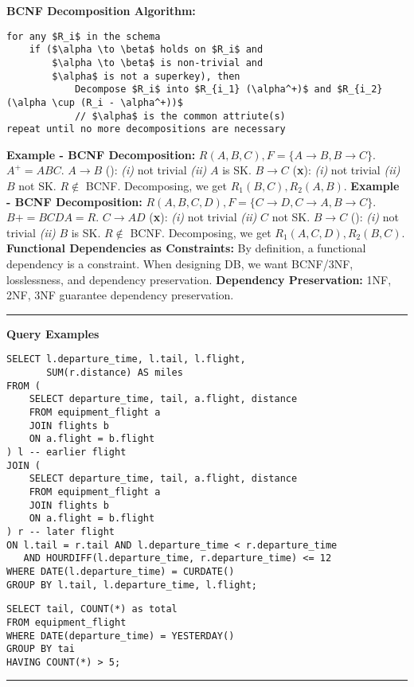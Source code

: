 \documentclass{report}
\renewcommand{\bf}[1]{\textbf{{#1}}}
\renewcommand{\it}[1]{\textit{{#1}}}
\begin{document}
\bf{BCNF Decomposition Algorithm:}
\vspace{-0.8em}
\begin{lstlisting}
for any $R_i$ in the schema
    if ($\alpha \to \beta$ holds on $R_i$ and
        $\alpha \to \beta$ is non-trivial and
        $\alpha$ is not a superkey), then
            Decompose $R_i$ into $R_{i_1} (\alpha^+)$ and $R_{i_2} (\alpha \cup (R_i - \alpha^+))$
            // $\alpha$ is the common attriute(s)
repeat until no more decompositions are necessary
\end{lstlisting}
\vspace{-0.5em}
\bf{Example - BCNF Decomposition:} $R(A, B, C), F = \{A \to B, B \to C\}$. $A^+ = ABC$.
$A \to B$ (\checkmark): \it{(i)} not trivial \it{(ii)} $A$ is SK.
$B \to C$ (\bf{\textsf{x}}): \it{(i)} not trivial \it{(ii)} $B$ not SK.
$R \not \in$ BCNF. Decomposing, we get $R_1(B, C), R_2(A, B)$.
\hfil \newline
\bf{Example - BCNF Decomposition:} $R(A, B, C, D), F = \{C \to D, C \to A, B \to C\}$. $B+ = BCDA =
R$.
$C \to AD$ (\bf{\textsf{x}}): \it{(i)} not trivial \it{(ii)} $C$ not SK.
$B \to C$ (\checkmark): \it{(i)} not trivial \it{(ii)} $B$ is SK.
$R \not \in$ BCNF. Decomposing, we get $R_1(A, C, D), R_2(B, C)$.
\newpage
\bf{Functional Dependencies as Constraints:} By definition, a functional dependency is a constraint.
When designing DB, we want BCNF/3NF, losslessness, and dependency preservation.
\hfil \newline
\bf{Dependency Preservation:} 1NF, 2NF, 3NF guarantee dependency preservation.
\hfil \newline
\vspace{-0.8em}
\hrule
\vspace{0.2em}

\bf{Query Examples}
\vspace{-1em}
\begin{multicols}{2}
    \begin{verbatim}
SELECT l.departure_time, l.tail, l.flight, 
       SUM(r.distance) AS miles
FROM (
    SELECT departure_time, tail, a.flight, distance
    FROM equipment_flight a
    JOIN flights b
    ON a.flight = b.flight
) l -- earlier flight
JOIN (
    SELECT departure_time, tail, a.flight, distance
    FROM equipment_flight a
    JOIN flights b
    ON a.flight = b.flight
) r -- later flight
ON l.tail = r.tail AND l.departure_time < r.departure_time 
   AND HOURDIFF(l.departure_time, r.departure_time) <= 12
WHERE DATE(l.departure_time) = CURDATE()
GROUP BY l.tail, l.departure_time, l.flight;
    \end{verbatim}
    \columnbreak
    \begin{verbatim}
SELECT tail, COUNT(*) as total
FROM equipment_flight
WHERE DATE(departure_time) = YESTERDAY()
GROUP BY tai
HAVING COUNT(*) > 5;
    \end{verbatim}
\end{multicols}
\vspace{-1em}
\hrule
\vspace{0.2em}
\end{document}
